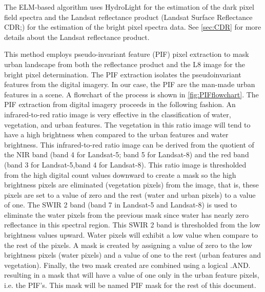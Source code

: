 The ELM-based algorithm uses HydroLight for the estimation of the dark pixel field spectra and the Landsat reflectance product (Landsat Surface Reflectance CDR;\cite{LandsatCDR}) for the estimation of the bright pixel spectra data. See \autoref{sec:CDR} for more details about the Landsat reflectance product.

This method employs pseudo-invariant feature (PIF) pixel extraction \cite{Schott:1988} to mask urban landscape from both the reflectance product and the L8 image for the bright pixel determination. The PIF extraction isolates the pseudoinvariant features from the digital imagery. In our case, the PIF are the man-made urban features in a scene. A flowchart of the process is shown in \autoref{fig:PIFflowchart}. The PIF extraction from digital imagery proceeds in the following fashion. An infrared-to-red ratio image is very effective in the classification of water, vegetation, and urban features. The vegetation in this ratio image will tend to have a high brightness when compared to the urban features and water brightness. This infrared-to-red ratio image can be derived from the quotient of the NIR band (band 4 for Landsat-5; band 5 for Landsat-8) and the red band (band 3 for Landsat-5,band 4 for Landsat-8). This ratio image is thresholded from the high digital count values downward to create a mask so the high brightness pixels are eliminated (vegetation pixels) from the image, that is, these pixels are set to a value of zero and the rest (water and urban pixels) to a value of one. The SWIR 2 band (band 7 in Landsat-5 and Landsat-8) is used to eliminate the water pixels from the previous mask since water has nearly zero reflectance in this spectral region. This SWIR 2 band is thresholded from the low brightness values upward. Water pixels will exhibit a low value when compare to the rest of the pixels. A mask is created by assigning a value of zero to the low brightness pixels (water pixels) and a value of one to the rest (urban features and vegetation). Finally, the two mask created are combined using a logical .AND. resulting in a mask that will have a value of one only in the urban feature pixels, i.e. the PIF's. This mask will be named PIF mask for the rest of this document.

